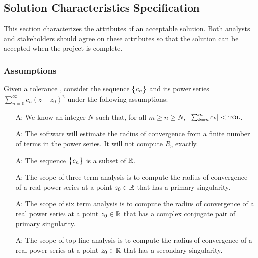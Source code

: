 \documentclass[12pt]{article}
\newcounter{assumpnum} %
\begin{document}
\subsection{Solution Characteristics Specification}

This section characterizes the attributes of an acceptable solution.
Both analysts and stakeholders should agree on these attributes
so that the solution can be accepted when the project is complete.

\subsubsection{Assumptions} \label{sec_assumpt}

Given a tolerance \tol, consider the sequence $\bigl\{ {c_n} \bigr\}$ and its power series
$\sum_{n=0}^{\infty} c_n (z-z_0)^n$
under the following assumptions:

\begin{itemize}

\item[A\refstepcounter{assumpnum}\theassumpnum \label{as:n}:]
  We know an integer $N$ such that, for all $m \geq n \geq N$,
  $| \sum_{k=n}^{m} c_k | < \text{\sc tol}$.

\item[A\refstepcounter{assumpnum}\theassumpnum \label{as:approximate}:]
  The software  will estimate the radius of convergence from a finite number of terms
  in the power series. It will not compute $R_c$ exactly. 

\item[A\refstepcounter{assumpnum}\theassumpnum \label{as:real}:]
  The sequence $\bigl\{ {c_n} \bigr\}$ is a subset of $\mathbb{R}$.

\item[A\refstepcounter{assumpnum}\theassumpnum \label{as:threeterm}:]
  The scope of three term analysis is to compute the radius of convergence of
  a real power series at a point $z_0 \in \mathbb{R}$ that has a primary singularity.

\item[A\refstepcounter{assumpnum}\theassumpnum \label{as:sixterm}:]
  The scope of six term analysis is to compute the radius of convergence of
  a real power series at a point $z_0 \in \mathbb{R}$ that has a complex conjugate pair of
  primary singularity.

\item[A\refstepcounter{assumpnum}\theassumpnum \label{as:topline}:]
  The scope of top line analysis is to compute the radius of convergence of
  a real power series at a point $z_0 \in \mathbb{R}$ that has a secondary singularity.

\end{itemize}
\end{document}

